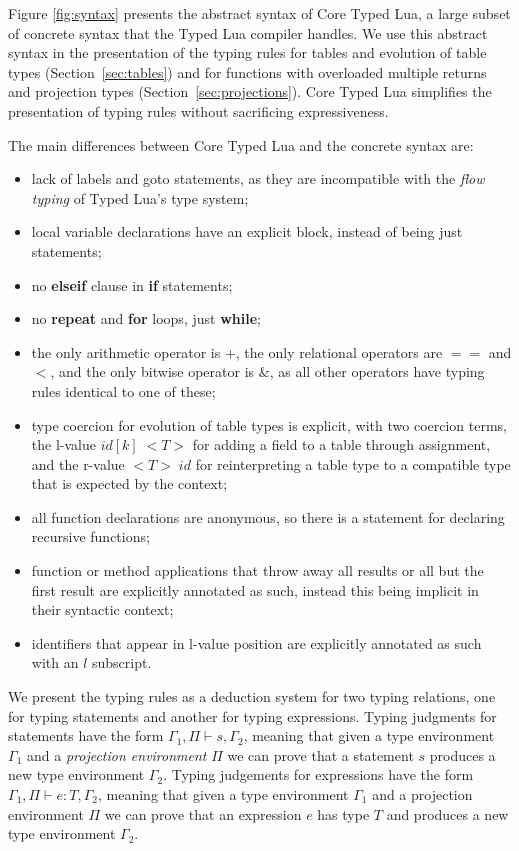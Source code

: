 \documentclass{sigplanconf}
\newcommand{\env}{\Gamma}
\newcommand{\penv}{\Pi}
\begin{document}
Figure \ref{fig:syntax} presents the abstract syntax of 
Core Typed Lua, a large subset of concrete syntax
that the Typed Lua compiler handles. We use this abstract
syntax in the presentation of the typing rules
for tables and evolution of table types (Section~\ref{sec:tables})
and for functions with overloaded multiple returns and
projection types (Section~\ref{sec:projections}).
Core Typed Lua simplifies the presentation of typing rules
without sacrificing expressiveness.

The main differences between Core Typed Lua and the concrete
syntax are:
\begin{itemize}
\item lack of labels and goto statements, as they are incompatible
with the {\em flow typing} of Typed Lua's type system;
\item local variable declarations have an explicit block,
instead of being just statements;
\item no {\bf elseif} clause in {\bf if} statements;
\item no {\bf repeat} and {\bf for} loops, just {\bf while};
\item the only arithmetic operator is $+$, the only relational
operators are $==$ and $<$, and the only bitwise operator
is $\&$, as all other operators have typing rules identical to
one of these;
\item type coercion for evolution of table types is explicit,
with two coercion terms, the l-value $id[k] \; {<}T{>}$ for adding a field to 
a table through assignment, and the r-value ${<}T{>} \;id$ for reinterpreting
a table type to a compatible type that is expected by the context;
\item all function declarations are anonymous, so there is a
statement for declaring recursive functions;
\item function or method applications that throw away all
results or all but the first result are explicitly annotated
as such, instead this being implicit in their syntactic context;
\item identifiers that appear in l-value position are explicitly
annotated as such with an $l$ subscript.
\end{itemize}

We present the typing rules as a deduction system for two typing relations, one for typing statements and another for typing expressions. Typing judgments for statements have the form $\env_{1}, \penv \vdash s, \env_{2}$, meaning that
given a type environment $\env_{1}$ and a {\em projection environment} $\penv$ we can prove that a statement $s$ produces a new type environment $\env_{2}$. Typing judgements for
expressions have the form $\env_{1}, \penv \vdash e : T, \env_{2}$, meaning that given a type environment $\env_{1}$
and a projection environment $\penv$ we can prove that an expression $e$ has type $T$ and produces a new type environment $\env_{2}$.
\end{document}
